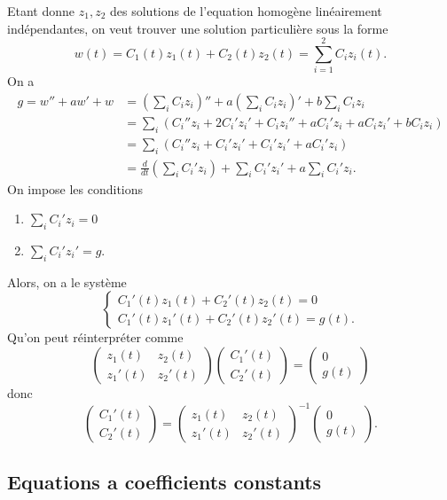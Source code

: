 Etant donne $z_{1},z_{2}$ des solutions de l'equation homogène linéairement indépendantes, on veut trouver une solution particulière sous la forme 
$$
w(t)=C_{1}(t)z_{1}(t)+C_{2}(t)z_{2}(t)=\sum_{i=1}^{2} C_{i}z_{i}(t).
$$
On a
\begin{align*}
g=w''+aw'+w & =\left( \sum _{i}C_{i}z_{i} \right)''+a\left( \sum _{i}C_{i}z_{i} \right)'+b\sum _{i}C_{i}z_{i} \\
 & =\sum _{i}(C_{i}''z_{i}+2C_{i}'z_{i}'+C_{i}z_{i}''+aC_{i}'z_{i}+aC_{i}z_{i}'+bC_{i}z_{i}) \\
 & =\sum _{i}(C_{i}''z_{i}+C_{i}'z_{i}' +C_{i}'z_{i}'+aC_{i}'z_{i}) \\
 & =\frac{d}{dt} \left( \sum _{i}C_{i}'z_{i} \right)+\sum _{i}C_{i}'z_{i}'+a\sum _{i}C_{i}'z_{i}.
\end{align*}
On impose les conditions
\begin{enumerate}
\item $\sum _{i}C_{i}'z_{i}=0$
\item $\sum _{i}C_{i}'z_{i}'=g$.
\end{enumerate}
Alors, on a le système 
$$
\begin{cases}
C_{1}'(t)z_{1}(t)+C_{2}'(t)z_{2}(t)=0 \\
C_{1}'(t)z_{1}'(t)+C_{2}'(t)z_{2}'(t)=g(t).
\end{cases}
$$
Qu'on peut réinterpréter comme
$$
\begin{pmatrix}
z_{1}(t) & z_{2}(t) \\
z_{1}'(t) & z_{2}'(t)
\end{pmatrix}\begin{pmatrix}
C_{1}'(t) \\
C_{2}'(t)
\end{pmatrix}=\begin{pmatrix}
0 \\
g(t)
\end{pmatrix}
$$
donc
$$
\begin{pmatrix}
C_{1}'(t) \\
C_{2}'(t)
\end{pmatrix}=\begin{pmatrix}
z_{1}(t) & z_{2}(t) \\
z_{1}'(t) & z_{2}'(t)
\end{pmatrix}^{-1}\begin{pmatrix}
0 \\
g(t)
\end{pmatrix}.
$$

\subsection{Equations a coefficients constants}

